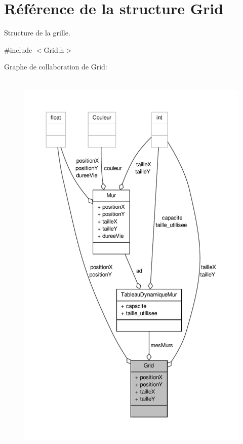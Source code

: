 \hypertarget{structGrid}{\section{Référence de la structure Grid}
\label{structGrid}
}


Structure de la grille.  




{\ttfamily \#include $<$Grid.\-h$>$}



Graphe de collaboration de Grid\-:
\nopagebreak
\begin{figure}[H]
\begin{center}
\leavevmode
\includegraphics[height=550pt]{structGrid__coll__graph}
\end{center}
\end{figure}
